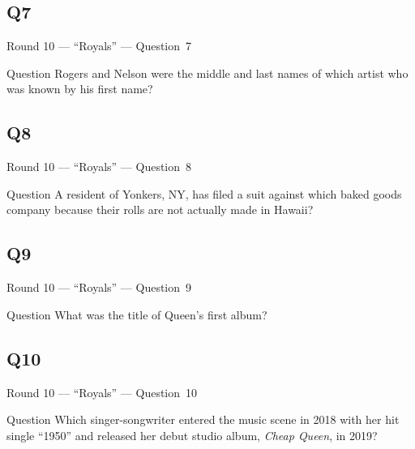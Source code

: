 \documentclass[11pt]{beamer}
\begin{document}
\subsection*{Q7}
\begin{frame}[t]{Round 10 --- ``Royals'' --- \mbox{Question 7}}
\vspace{-0.5em}
\begin{block}{Question}
Rogers and Nelson were the middle and last names of which artist who was known by his first name?
\end{block}
\end{frame}
\subsection*{Q8}
\begin{frame}[t]{Round 10 --- ``Royals'' --- \mbox{Question 8}}
\vspace{-0.5em}
\begin{block}{Question}
A resident of Yonkers, NY, has filed a suit against which baked goods company because their rolls are not actually made in Hawaii?
\end{block}
\end{frame}
\subsection*{Q9}
\begin{frame}[t]{Round 10 --- ``Royals'' --- \mbox{Question 9}}
\vspace{-0.5em}
\begin{block}{Question}
What was the title of Queen's first album?
\end{block}
\end{frame}
\subsection*{Q10}
\begin{frame}[t]{Round 10 --- ``Royals'' --- \mbox{Question 10}}
\vspace{-0.5em}
\begin{block}{Question}
Which singer-songwriter entered the music scene in 2018 with her hit single ``1950'' and released her debut studio album, \emph{Cheap Queen}, in 2019?
\end{block}
\end{frame}
\end{document}
